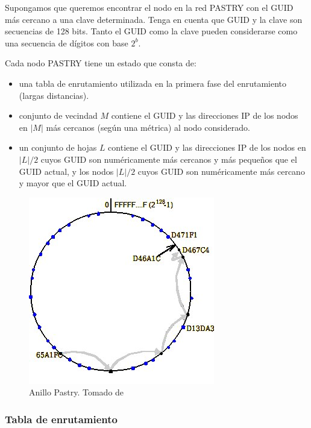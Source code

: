  Supongamos que queremos encontrar el nodo en la red PASTRY con el GUID más cercano a una clave determinada. Tenga en cuenta que GUID y la clave son secuencias de 128 bits. Tanto el GUID como la clave pueden considerarse como una secuencia de dígitos con base $2^{b}$.


Cada nodo PASTRY tiene un estado que consta de:
\begin{itemize}
	\item una tabla de enrutamiento utilizada en la primera fase del enrutamiento (largas distancias).
	\item conjunto de vecindad $M$ contiene el GUID y las direcciones IP de los nodos en  $|M|$ más cercanos (según una métrica) al nodo considerado. 
	\item un conjunto de hojas $L$ contiene el GUID y las direcciones IP de los nodos en  $|L|/2$ cuyos GUID son numéricamente más cercanos y más pequeños que el GUID actual, y los nodos $|L|/2$ cuyos GUID son numéricamente más cercano y mayor que el GUID actual.
\end{itemize}  



	\begin{figure}%
 		\includegraphics {10/pastry-et} 
		\caption{Anillo Pastry. Tomado de \cite{Coulouris2011}}
		\label{fig:pastry}
\end{figure}
 
 
 \subsubsection{Tabla de enrutamiento}
 

